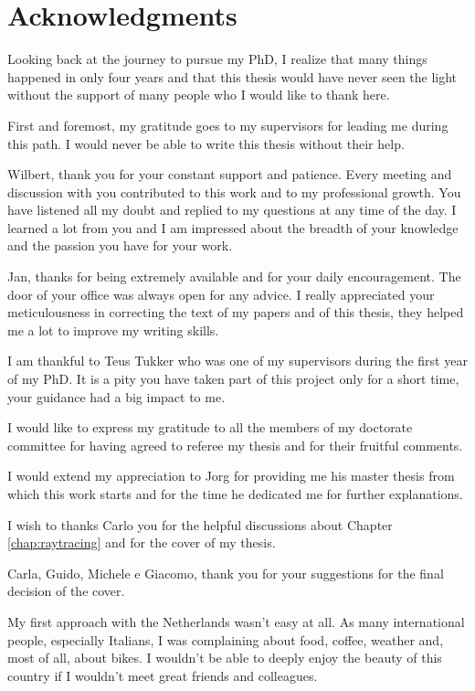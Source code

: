 \clearpage{\pagestyle{empty}\cleardoublepage}

\chapter*{Acknowledgments}
\markboth{}{}
Looking back at the journey to pursue my PhD, I realize that many things happened in only four years and that this thesis would have never seen the light without the support of many people who I would like to thank here.  

First and foremost, my gratitude goes to my supervisors for leading me during this path. I would never be able to write this thesis without their help.

Wilbert, thank you for your constant support and patience. Every meeting and discussion with you contributed to this work and to my professional growth. 
You have listened all my doubt and replied to my questions at any time of the day.
I learned a lot from you and I am impressed about the breadth of your knowledge and the passion you have for your work. 

Jan, thanks for being extremely available and for your daily encouragement. The door of your office was always open for any advice. 
I really appreciated your meticulousness in correcting the text of my papers and of this thesis, they helped me a lot to improve my writing skills.

I am thankful to Teus Tukker who was one of my supervisors during the first year of my PhD. It is a pity you have taken part of this project only for a short time, your guidance had a big impact to me.

I would like to express my gratitude to all the members of my doctorate committee for having agreed to referee my thesis and for their fruitful comments.  

I would extend my appreciation to Jorg for providing me his master thesis from which this work starts and for the time he dedicated me for further explanations.

I wish to thanks Carlo you for the helpful discussions about Chapter \ref{chap:raytracing} and for the cover of my thesis. 

Carla, Guido, Michele e Giacomo, thank you for your suggestions for the final decision of the cover.

My first approach with the Netherlands wasn't easy at all. As many international people, especially Italians, I was complaining about food, coffee, weather and, most of all, about bikes. 
I wouldn't be able to deeply enjoy the beauty of this country if I wouldn't meet great friends and colleagues.


